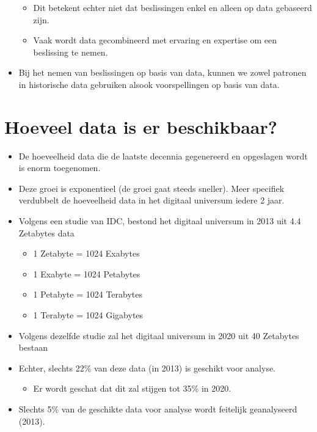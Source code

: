 \documentclass[]{memoir}
\providecommand{\tightlist}{%
  \setlength{\itemsep}{0pt}\setlength{\parskip}{0pt}}
\begin{document}
\begin{itemize}
  \begin{itemize}
  \tightlist
  \item
    Dit betekent echter niet dat beslissingen enkel en alleen op data gebaseerd zijn.
  \item
    Vaak wordt data gecombineerd met ervaring en expertise om een beslissing te nemen.
  \end{itemize}
\item
  Bij het nemen van beslissingen op basis van data, kunnen we zowel patronen in historische data gebruiken alsook voorspellingen op basis van data.
\end{itemize}

\hypertarget{hoeveel-data-is-er-beschikbaar}{%
\section{Hoeveel data is er beschikbaar?}\label{hoeveel-data-is-er-beschikbaar}}

\begin{itemize}
\tightlist
\item
  De hoeveelheid data die de laatste decennia gegenereerd en opgeslagen wordt is enorm toegenomen.
\item
  Deze groei is exponentieel (de groei gaat steeds sneller). Meer specifiek verdubbelt de hoeveelheid data in het digitaal universum iedere 2 jaar.
\item
  Volgens een studie van IDC, bestond het digitaal universum in 2013 uit 4.4 Zetabytes data

  \begin{itemize}
  \tightlist
  \item
    1 Zetabyte = 1024 Exabytes
  \item
    1 Exabyte = 1024 Petabytes
  \item
    1 Petabyte = 1024 Terabytes
  \item
    1 Terabyte = 1024 Gigabytes
  \end{itemize}
\item
  Volgens dezelfde studie zal het digitaal universum in 2020 uit 40 Zetabytes bestaan
\item
  Echter, slechts 22\% van deze data (in 2013) is geschikt voor analyse.

  \begin{itemize}
  \tightlist
  \item
    Er wordt geschat dat dit zal stijgen tot 35\% in 2020.
  \end{itemize}
\item
  Slechts 5\% van de geschikte data voor analyse wordt feitelijk geanalyseerd (2013).
\end{itemize}
\end{document}
